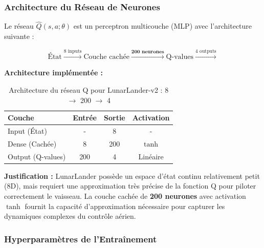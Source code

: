 \subsubsection{Architecture du Réseau de Neurones}

Le réseau $\hat{Q}(s,a;\theta)$ est un perceptron multicouche (MLP) avec l'architecture suivante :

\[
\text{État} \xrightarrow{8 \text{ inputs}} \text{Couche cachée} \xrightarrow{\textbf{200 neurones}} \text{Q-values} \xrightarrow{4 \text{ outputs}}
\]

\textbf{Architecture implémentée :}

\begin{table}[h!]
    \centering
    \begin{tabular}{|l|c|c|c|}
    \hline
    \textbf{Couche} & \textbf{Entrée} & \textbf{Sortie} & \textbf{Activation} \\
    \hline
    Input (État) & - & 8 & - \\
    \hline
    Dense (Cachée) & 8 & 200 & $\tanh$ \\
    \hline
    Output (Q-values) & 200 & 4 & Linéaire \\
    \hline
    \end{tabular}
    \caption{Architecture du réseau Q pour LunarLander-v2 : 8 $\to$ 200 $\to$ 4}
\end{table}

\textbf{Justification :} LunarLander possède un espace d'état continu relativement petit (8D), mais requiert une approximation très précise de la fonction Q pour piloter correctement le vaisseau. La couche cachée de \textbf{200 neurones} avec activation $\tanh$ fournit la capacité d'approximation nécessaire pour capturer les dynamiques complexes du contrôle aérien.

\subsubsection{Hyperparamètres de l'Entraînement}

